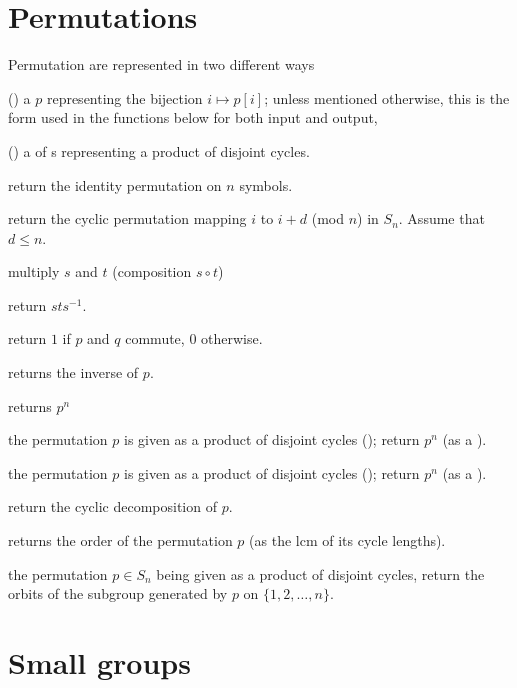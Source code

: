 \section{Permutations }

\noindent Permutation are represented in two different ways

\item () a  $p$ representing the bijection $i\mapsto
p[i]$; unless mentioned otherwise, this is the form used in the functions
below for both input and output,

\item () a  of s representing a product of
disjoint cycles.

 return the identity permutation on $n$
symbols.

 return the cyclic permutation mapping
$i$ to $i+d$ (mod $n$) in $S_n$. Assume that $d \leq n$.

 multiply $s$ and $t$ (composition $s\circ t$)

 return $sts^{-1}$.

 return $1$ if $p$ and $q$ commute, 0
otherwise.

 returns the inverse of $p$.

 returns $p^n$

 the permutation $p$ is given as
a product of disjoint cycles (); return $p^n$ (as a ).

 the permutation $p$ is given as
a product of disjoint cycles (); return $p^n$ (as a ).

 return the cyclic decomposition of $p$.

 returns the order of the permutation $p$
(as the lcm of its cycle lengths).

 the permutation $p\in S_n$ being
given as a product of disjoint cycles, return the orbits of the subgroup
generated by $p$ on $\{1,2,\ldots,n\}$.

\section{Small groups}

